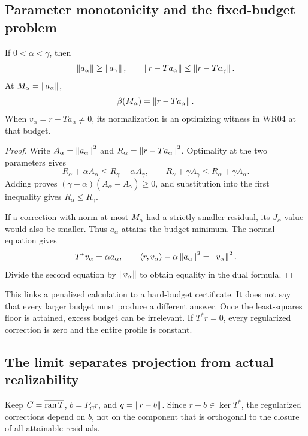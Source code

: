\subsection{Parameter monotonicity and the fixed-budget problem}
\begin{proposition}\label{WR07}
If $0<\alpha<\gamma$, then
\[
 \left\lVert a_\alpha\right\rVert\ge\left\lVert a_\gamma\right\rVert,\qquad
 \left\lVert r-Ta_\alpha\right\rVert\le\left\lVert r-Ta_\gamma\right\rVert.
\]
At $M_\alpha=\left\lVert a_\alpha\right\rVert$,
\[
 \beta(M_\alpha)=\left\lVert r-Ta_\alpha\right\rVert.
\]
When $v_\alpha=r-Ta_\alpha\ne0$, its normalization is an optimizing witness in WR04 at that budget.
\end{proposition}
\begin{proof}
Write $A_\alpha=\left\lVert a_\alpha\right\rVert^2$ and $R_\alpha=\left\lVert r-Ta_\alpha\right\rVert^2$. Optimality at the two parameters gives
\[
 R_\alpha+\alpha A_\alpha\le R_\gamma+\alpha A_\gamma,
 \qquad
 R_\gamma+\gamma A_\gamma\le R_\alpha+\gamma A_\alpha.
\]
Adding proves $(\gamma-\alpha)(A_\alpha-A_\gamma)\ge0$, and substitution into the first inequality gives $R_\alpha\le R_\gamma$.

If a correction with norm at most $M_\alpha$ had a strictly smaller residual, its $J_\alpha$ value would also be smaller. Thus $a_\alpha$ attains the budget minimum. The normal equation gives
\[
 T^*v_\alpha=\alpha a_\alpha,\qquad
 \langle r,v_\alpha\rangle-\alpha\left\lVert a_\alpha\right\rVert^2
 =\left\lVert v_\alpha\right\rVert^2.
\]
Divide the second equation by $\left\lVert v_\alpha\right\rVert$ to obtain equality in the dual formula.
\end{proof}

This links a penalized calculation to a hard-budget certificate. It does not say that every larger budget must produce a different answer. Once the least-squares floor is attained, excess budget can be irrelevant. If $T^*r=0$, every regularized correction is zero and the entire profile is constant.

\subsection{The limit separates projection from actual realizability}
Keep $C=\overline{\operatorname{ran} T}$, $b=P_Cr$, and $q=\left\lVert r-b\right\rVert$. Since $r-b\in\ker T^*$, the regularized corrections depend on $b$, not on the component that is orthogonal to the closure of all attainable residuals.

